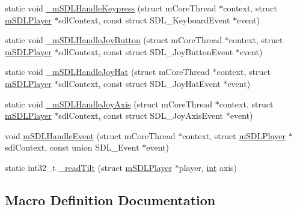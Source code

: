 \begin{DoxyCompactItemize}
\item 
static void \mbox{\hyperlink{sdl-events_8c_aa2c971f6d7cf960e3add9bd2252c8da5}{\+\_\+m\+S\+D\+L\+Handle\+Keypress}} (struct m\+Core\+Thread $\ast$context, struct \mbox{\hyperlink{sdl-events_8h_structm_s_d_l_player}{m\+S\+D\+L\+Player}} $\ast$sdl\+Context, const struct S\+D\+L\+\_\+\+Keyboard\+Event $\ast$event)
\item 
static void \mbox{\hyperlink{sdl-events_8c_a8b984affb2018edd5d8ec595f566921c}{\+\_\+m\+S\+D\+L\+Handle\+Joy\+Button}} (struct m\+Core\+Thread $\ast$context, struct \mbox{\hyperlink{sdl-events_8h_structm_s_d_l_player}{m\+S\+D\+L\+Player}} $\ast$sdl\+Context, const struct S\+D\+L\+\_\+\+Joy\+Button\+Event $\ast$event)
\item 
static void \mbox{\hyperlink{sdl-events_8c_a67374fa271dc2b13d5f8ec2d42d2d0ce}{\+\_\+m\+S\+D\+L\+Handle\+Joy\+Hat}} (struct m\+Core\+Thread $\ast$context, struct \mbox{\hyperlink{sdl-events_8h_structm_s_d_l_player}{m\+S\+D\+L\+Player}} $\ast$sdl\+Context, const struct S\+D\+L\+\_\+\+Joy\+Hat\+Event $\ast$event)
\item 
static void \mbox{\hyperlink{sdl-events_8c_a110357fc8005187a13ee71c153747a22}{\+\_\+m\+S\+D\+L\+Handle\+Joy\+Axis}} (struct m\+Core\+Thread $\ast$context, struct \mbox{\hyperlink{sdl-events_8h_structm_s_d_l_player}{m\+S\+D\+L\+Player}} $\ast$sdl\+Context, const struct S\+D\+L\+\_\+\+Joy\+Axis\+Event $\ast$event)
\item 
void \mbox{\hyperlink{sdl-events_8c_a32623e2272fd40a24e3941e351a273a4}{m\+S\+D\+L\+Handle\+Event}} (struct m\+Core\+Thread $\ast$context, struct \mbox{\hyperlink{sdl-events_8h_structm_s_d_l_player}{m\+S\+D\+L\+Player}} $\ast$sdl\+Context, const union S\+D\+L\+\_\+\+Event $\ast$event)
\item 
static int32\+\_\+t \mbox{\hyperlink{sdl-events_8c_a42f03cbde6b9c602263a251937d49567}{\+\_\+read\+Tilt}} (struct \mbox{\hyperlink{sdl-events_8h_structm_s_d_l_player}{m\+S\+D\+L\+Player}} $\ast$player, \mbox{\hyperlink{ioapi_8h_a787fa3cf048117ba7123753c1e74fcd6}{int}} axis)
\end{DoxyCompactItemize}


\subsection{Macro Definition Documentation}
\mbox{\label{sdl-events_8c_a684c816c6f91dd4ba0f8528f8237aa1e}} 
